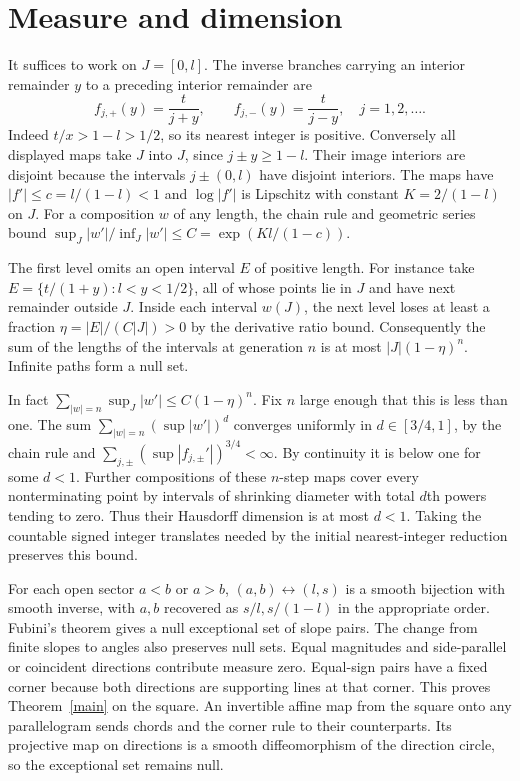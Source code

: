 \documentclass[11pt]{article}
\begin{document}
\section{Measure and dimension}
It suffices to work on $J=[0,l]$. The inverse branches carrying an interior remainder $y$ to a preceding interior remainder are
\[
 f_{j,+}(y)=\frac{t}{j+y},\qquad f_{j,-}(y)=\frac{t}{j-y},\quad j=1,2,\ldots .
\]
Indeed $t/x>1-l>1/2$, so its nearest integer is positive. Conversely all displayed maps take $J$ into $J$, since $j\mathbin{\pm}y\ge1-l$. Their image interiors are disjoint because the intervals $j\mathbin{\pm}(0,l)$ have disjoint interiors. The maps have $|f'|\le c=l/(1-l)<1$ and $\log|f'|$ is Lipschitz with constant $K=2/(1-l)$ on $J$. For a composition $w$ of any length, the chain rule and geometric series bound $\sup_J|w'|/\inf_J|w'|\le C=\exp(Kl/(1-c))$.

The first level omits an open interval $E$ of positive length. For instance take $E=\{t/(1+y):l<y<1/2\}$, all of whose points lie in $J$ and have next remainder outside $J$. Inside each interval $w(J)$, the next level loses at least a fraction $\eta=|E|/(C|J|)>0$ by the derivative ratio bound. Consequently the sum of the lengths of the intervals at generation $n$ is at most $|J|(1-\eta)^n$. Infinite paths form a null set.

In fact $\sum_{|w|=n}\sup_J |w'|\le C(1-\eta)^n$. Fix $n$ large enough that this is less than one. The sum $\sum_{|w|=n}(\sup |w'|)^d$ converges uniformly in $d\in[3/4,1]$, by the chain rule and $\sum_{j,\pm}(\sup|f_{j,\pm}'|)^{3/4}<\infty$. By continuity it is below one for some $d<1$. Further compositions of these $n$-step maps cover every nonterminating point by intervals of shrinking diameter with total $d$th powers tending to zero. Thus their Hausdorff dimension is at most $d<1$. Taking the countable signed integer translates needed by the initial nearest-integer reduction preserves this bound.

For each open sector $a<b$ or $a>b$, $(a,b)\leftrightarrow (l,s)$ is a smooth bijection with smooth inverse, with $a,b$ recovered as $s/l,s/(1-l)$ in the appropriate order. Fubini's theorem gives a null exceptional set of slope pairs. The change from finite slopes to angles also preserves null sets. Equal magnitudes and side-parallel or coincident directions contribute measure zero. Equal-sign pairs have a fixed corner because both directions are supporting lines at that corner. This proves Theorem~\ref{main} on the square. An invertible affine map from the square onto any parallelogram sends chords and the corner rule to their counterparts. Its projective map on directions is a smooth diffeomorphism of the direction circle, so the exceptional set remains null.
\end{document}
